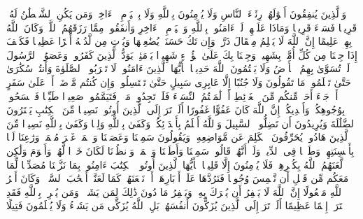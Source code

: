 \stopbuffer%
\startbuffer[\q:4:38]
وَٱلَّذِینَ یُنفِقُونَ أَمۡوَٰلَهُمۡ رِئَاۤءَ ٱلنَّاسِ وَلَا یُؤۡمِنُونَ بِٱللَّهِ وَلَا بِٱلۡیَوۡمِ ٱلۡءَاخِرِۗ وَمَن یَكُنِ ٱلشَّیۡطَٰنُ لَهُۥ قَرِینࣰا فَسَاۤءَ قَرِینࣰا%
\stopbuffer%
\startbuffer[\q:4:39]
وَمَاذَا عَلَیۡهِمۡ لَوۡ ءَامَنُوا۟ بِٱللَّهِ وَٱلۡیَوۡمِ ٱلۡءَاخِرِ وَأَنفَقُوا۟ مِمَّا رَزَقَهُمُ ٱللَّهُۚ وَكَانَ ٱللَّهُ بِهِمۡ عَلِیمًا%
\stopbuffer%
\startbuffer[\q:4:40]
إِنَّ ٱللَّهَ لَا یَظۡلِمُ مِثۡقَالَ ذَرَّةࣲۖ وَإِن تَكُ حَسَنَةࣰ یُضَٰعِفۡهَا وَیُؤۡتِ مِن لَّدُنۡهُ أَجۡرًا عَظِیمࣰا%
\stopbuffer%
\startbuffer[\q:4:41]
فَكَیۡفَ إِذَا جِئۡنَا مِن كُلِّ أُمَّةِۭ بِشَهِیدࣲ وَجِئۡنَا بِكَ عَلَىٰ هَٰۤؤُلَاۤءِ شَهِیدࣰا%
\stopbuffer%
\startbuffer[\q:4:42]
یَوۡمَئِذࣲ یَوَدُّ ٱلَّذِینَ كَفَرُوا۟ وَعَصَوُا۟ ٱلرَّسُولَ لَوۡ تُسَوَّىٰ بِهِمُ ٱلۡأَرۡضُ وَلَا یَكۡتُمُونَ ٱللَّهَ حَدِیثࣰا%
\stopbuffer%
\startbuffer[\q:4:43]
یَٰۤأَیُّهَا ٱلَّذِینَ ءَامَنُوا۟ لَا تَقۡرَبُوا۟ ٱلصَّلَوٰةَ وَأَنتُمۡ سُكَٰرَىٰ حَتَّىٰ تَعۡلَمُوا۟ مَا تَقُولُونَ وَلَا جُنُبًا إِلَّا عَابِرِی سَبِیلٍ حَتَّىٰ تَغۡتَسِلُوا۟ۚ وَإِن كُنتُم مَّرۡضَىٰۤ أَوۡ عَلَىٰ سَفَرٍ أَوۡ جَاۤءَ أَحَدࣱ مِّنكُم مِّنَ ٱلۡغَاۤئِطِ أَوۡ لَٰمَسۡتُمُ ٱلنِّسَاۤءَ فَلَمۡ تَجِدُوا۟ مَاۤءࣰ فَتَیَمَّمُوا۟ صَعِیدࣰا طَیِّبࣰا فَٱمۡسَحُوا۟ بِوُجُوهِكُمۡ وَأَیۡدِیكُمۡۗ إِنَّ ٱللَّهَ كَانَ عَفُوًّا غَفُورًا%
\stopbuffer%
\startbuffer[\q:4:44]
أَلَمۡ تَرَ إِلَى ٱلَّذِینَ أُوتُوا۟ نَصِیبࣰا مِّنَ ٱلۡكِتَٰبِ یَشۡتَرُونَ ٱلضَّلَٰلَةَ وَیُرِیدُونَ أَن تَضِلُّوا۟ ٱلسَّبِیلَ%
\stopbuffer%
\startbuffer[\q:4:45]
وَٱللَّهُ أَعۡلَمُ بِأَعۡدَاۤئِكُمۡۚ وَكَفَىٰ بِٱللَّهِ وَلِیࣰّا وَكَفَىٰ بِٱللَّهِ نَصِیرࣰا%
\stopbuffer%
\startbuffer[\q:4:46]
مِّنَ ٱلَّذِینَ هَادُوا۟ یُحَرِّفُونَ ٱلۡكَلِمَ عَن مَّوَاضِعِهِۦ وَیَقُولُونَ سَمِعۡنَا وَعَصَیۡنَا وَٱسۡمَعۡ غَیۡرَ مُسۡمَعࣲ وَرَٰعِنَا لَیَّۢا بِأَلۡسِنَتِهِمۡ وَطَعۡنࣰا فِی ٱلدِّینِۚ وَلَوۡ أَنَّهُمۡ قَالُوا۟ سَمِعۡنَا وَأَطَعۡنَا وَٱسۡمَعۡ وَٱنظُرۡنَا لَكَانَ خَیۡرࣰا لَّهُمۡ وَأَقۡوَمَ وَلَٰكِن لَّعَنَهُمُ ٱللَّهُ بِكُفۡرِهِمۡ فَلَا یُؤۡمِنُونَ إِلَّا قَلِیلࣰا%
\stopbuffer%
\startbuffer[\q:4:47]
یَٰۤأَیُّهَا ٱلَّذِینَ أُوتُوا۟ ٱلۡكِتَٰبَ ءَامِنُوا۟ بِمَا نَزَّلۡنَا مُصَدِّقࣰا لِّمَا مَعَكُم مِّن قَبۡلِ أَن نَّطۡمِسَ وُجُوهࣰا فَنَرُدَّهَا عَلَىٰۤ أَدۡبَارِهَاۤ أَوۡ نَلۡعَنَهُمۡ كَمَا لَعَنَّاۤ أَصۡحَٰبَ ٱلسَّبۡتِۚ وَكَانَ أَمۡرُ ٱللَّهِ مَفۡعُولًا%
\stopbuffer%
\startbuffer[\q:4:48]
إِنَّ ٱللَّهَ لَا یَغۡفِرُ أَن یُشۡرَكَ بِهِۦ وَیَغۡفِرُ مَا دُونَ ذَٰلِكَ لِمَن یَشَاۤءُۚ وَمَن یُشۡرِكۡ بِٱللَّهِ فَقَدِ ٱفۡتَرَىٰۤ إِثۡمًا عَظِیمًا%
\stopbuffer%
\startbuffer[\q:4:49]
أَلَمۡ تَرَ إِلَى ٱلَّذِینَ یُزَكُّونَ أَنفُسَهُمۚ بَلِ ٱللَّهُ یُزَكِّی مَن یَشَاۤءُ وَلَا یُظۡلَمُونَ فَتِیلًا%
